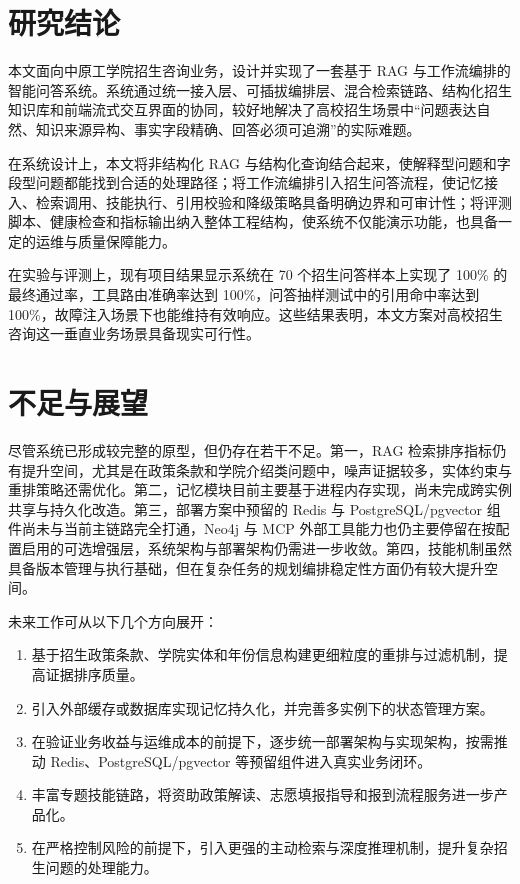 \documentclass[UTF8,zihao=-4,oneside,fontset=windows]{ctexbook}
\numberwithin{equation}{chapter}
\begin{document}
\section{研究结论}
本文面向中原工学院招生咨询业务，设计并实现了一套基于 RAG 与工作流编排的智能问答系统。系统通过统一接入层、可插拔编排层、混合检索链路、结构化招生知识库和前端流式交互界面的协同，较好地解决了高校招生场景中“问题表达自然、知识来源异构、事实字段精确、回答必须可追溯”的实际难题。

在系统设计上，本文将非结构化 RAG 与结构化查询结合起来，使解释型问题和字段型问题都能找到合适的处理路径；将工作流编排引入招生问答流程，使记忆接入、检索调用、技能执行、引用校验和降级策略具备明确边界和可审计性；将评测脚本、健康检查和指标输出纳入整体工程结构，使系统不仅能演示功能，也具备一定的运维与质量保障能力。

在实验与评测上，现有项目结果显示系统在 70 个招生问答样本上实现了 100\% 的最终通过率，工具路由准确率达到 100\%，问答抽样测试中的引用命中率达到 100\%，故障注入场景下也能维持有效响应。这些结果表明，本文方案对高校招生咨询这一垂直业务场景具备现实可行性。

\section{不足与展望}
尽管系统已形成较完整的原型，但仍存在若干不足。第一，RAG 检索排序指标仍有提升空间，尤其是在政策条款和学院介绍类问题中，噪声证据较多，实体约束与重排策略还需优化。第二，记忆模块目前主要基于进程内存实现，尚未完成跨实例共享与持久化改造。第三，部署方案中预留的 Redis 与 PostgreSQL/pgvector 组件尚未与当前主链路完全打通，Neo4j 与 MCP 外部工具能力也仍主要停留在按配置启用的可选增强层，系统架构与部署架构仍需进一步收敛。第四，技能机制虽然具备版本管理与执行基础，但在复杂任务的规划编排稳定性方面仍有较大提升空间。

未来工作可从以下几个方向展开：

\begin{enumerate}
  \item 基于招生政策条款、学院实体和年份信息构建更细粒度的重排与过滤机制，提高证据排序质量。
  \item 引入外部缓存或数据库实现记忆持久化，并完善多实例下的状态管理方案。
  \item 在验证业务收益与运维成本的前提下，逐步统一部署架构与实现架构，按需推动 Redis、PostgreSQL/pgvector 等预留组件进入真实业务闭环。
  \item 丰富专题技能链路，将资助政策解读、志愿填报指导和报到流程服务进一步产品化。
  \item 在严格控制风险的前提下，引入更强的主动检索与深度推理机制，提升复杂招生问题的处理能力。
\end{enumerate}
\end{document}
